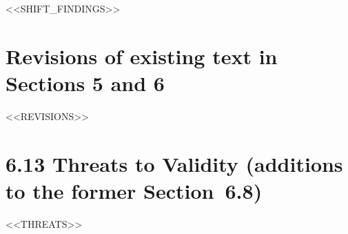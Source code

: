 \documentclass[11pt]{article}
\begin{document}
<<SHIFT_FINDINGS>>

\section*{Revisions of existing text in Sections 5 and 6}
<<REVISIONS>>

\section*{6.13 \quad Threats to Validity (additions to the former Section~6.8)}
<<THREATS>>
\end{document}
